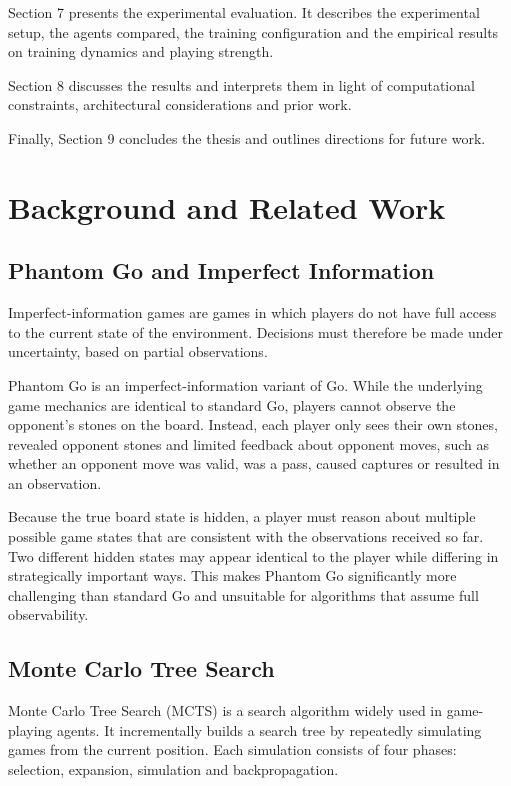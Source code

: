 \documentclass[12pt,oneside,openright]{article}
\begin{document}
Section 7 presents the experimental evaluation. It describes the experimental setup, the agents compared, the training configuration and the empirical results on training dynamics and playing strength.

Section 8 discusses the results and interprets them in light of computational constraints, architectural considerations and prior work.

Finally, Section 9 concludes the thesis and outlines directions for future work.


\section{Background and Related Work}

\subsection{Phantom Go and Imperfect Information}

Imperfect-information games are games in which players do not have full access to the current state of the environment. Decisions must therefore be made under uncertainty, based on partial observations.

Phantom Go is an imperfect-information variant of Go.
While the underlying game mechanics are identical to standard Go, players cannot observe the opponent's stones on the board. Instead, each player only sees their own stones, revealed opponent stones and limited feedback about opponent moves, such as whether an opponent move was valid, was a pass, caused captures or
resulted in an observation.

Because the true board state is hidden, a player must reason about multiple possible game states that are consistent with the observations received so far. Two different hidden states may appear identical to the player while differing in strategically important ways. This makes Phantom Go significantly more challenging than standard Go and unsuitable for algorithms that assume full observability\cite{Cazenave2006phantomGo}.

\subsection{Monte Carlo Tree Search}

Monte Carlo Tree Search (MCTS) is a search algorithm widely used in game-playing agents.
It incrementally builds a search tree by repeatedly simulating games from the current position.
Each simulation consists of four phases: selection, expansion, simulation and backpropagation.
\end{document}
